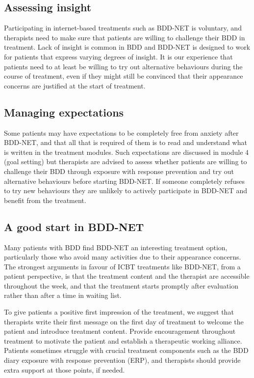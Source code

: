 \documentclass[]{book}
\theoremstyle{definition}
\theoremstyle{definition}
\theoremstyle{definition}
\theoremstyle{remark}
\begin{document}
\hypertarget{assessing-insight}{%
\subsection{Assessing insight}\label{assessing-insight}}

Participating in internet-based treatments such as BDD-NET is voluntary,
and therapists need to make sure that patients are willing to challenge
their BDD in treatment. Lack of insight is common in BDD and BDD-NET is
designed to work for patients that express varying degrees of insight.
It is our experience that patients need to at least be willing to try
out alternative behaviours during the course of treatment, even if they
might still be convinced that their appearance concerns are justified at
the start of treatment.

\hypertarget{managing-expectations}{%
\subsection{Managing expectations}\label{managing-expectations}}

Some patients may have expectations to be completely free from anxiety
after BDD-NET, and that all that is required of them is to read and
understand what is written in the treatment modules. Such expectations
are discussed in module 4 (goal setting) but therapists are advised to
assess whether patients are willing to challenge their BDD through
exposure with response prevention and try out alternative behaviours
before starting BDD-NET. If someone completely refuses to try new
behaviours they are unlikely to actively participate in BDD-NET and
benefit from the treatment.

\hypertarget{a-good-start-in-bdd-net}{%
\subsection{A good start in BDD-NET}\label{a-good-start-in-bdd-net}}

Many patients with BDD find BDD-NET an interesting treatment option,
particularly those who avoid many activities due to their appearance
concerns. The strongest arguments in favour of ICBT treatments like
BDD-NET, from a patient perspective, is that the treatment content and
the therapist are accessible throughout the week, and that the treatment
starts promptly after evaluation rather than after a time in waiting
list.

To give patients a positive first impression of the treatment, we
suggest that therapists write their first message on the first day of
treatment to welcome the patient and introduce treatment content.
Provide encouragement throughout treatment to motivate the patient and
establish a therapeutic working alliance. Patients sometimes struggle
with crucial treatment components such as the BDD diary exposure with
response prevention (ERP), and therapists should provide extra support
at those points, if needed.
\end{document}
